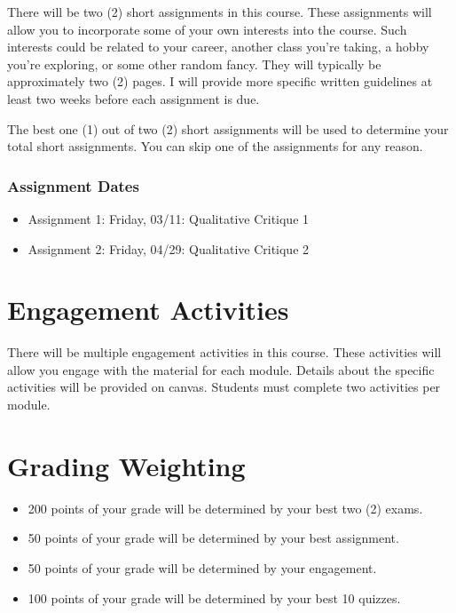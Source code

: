 There will be two (2) short assignments in this course. These assignments will allow you to incorporate some of your own interests into the course. Such interests could be related to your career, another class you're taking, a hobby you're exploring, or some other random fancy. They will typically be approximately two (2) pages. I will provide more specific written guidelines at least two weeks before each assignment is due.

The best one (1) out of two (2) short assignments will be used to determine your total short assignments. You can skip one of the assignments for any reason.

\hypertarget{assignment-dates}{%
\subsubsection*{Assignment Dates}\label{assignment-dates}}


\begin{itemize}
\item
  Assignment 1: Friday, 03/11: Qualitative Critique 1
\item
  Assignment 2: Friday, 04/29: Qualitative Critique 2
\end{itemize}

\hypertarget{engagement-activities-1}{%
\section*{Engagement Activities}\label{engagement-activities-1}}


There will be multiple engagement activities in this course. These activities will allow you engage with the material for each module. Details about the specific activities will be provided on canvas. Students must complete two activities per module.

\hypertarget{grading-weighting}{%
\section*{Grading Weighting}\label{grading-weighting}}


\begin{itemize}
\tightlist
\item
  200 points of your grade will be determined by your best two (2) exams.
\item
  50 points of your grade will be determined by your best assignment.
\item
  50 points of your grade will be determined by your engagement.
\item
  100 points of your grade will be determined by your best 10 quizzes.
\end{itemize}

